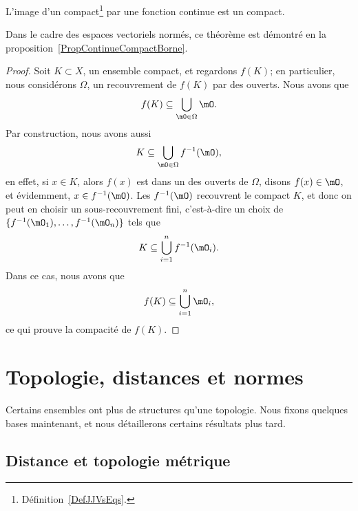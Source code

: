 \begin{theorem}     \label{ThoImCompCotComp}
L'image d'un compact\footnote{Définition~\ref{DefJJVsEqs}.} par une fonction continue est un compact.
\end{theorem}
Dans le cadre des espaces vectoriels normés, ce théorème est démontré en la proposition~\ref{PropContinueCompactBorne}.

\begin{proof}
    Soit $K\subset X$, un ensemble compact, et regardons $f(K)$; en particulier, nous considérons $\Omega$, un recouvrement de $f(K)$ par des ouverts. Nous avons que
    \begin{equation}
        f(K)\subseteq\bigcup_{\mO\in\Omega}\mO.
    \end{equation}
    Par construction, nous avons aussi
    \begin{equation}
        K\subseteq\bigcup_{\mO\in\Omega}f^{-1}(\mO),
    \end{equation}
    en effet, si $x\in K$, alors $f(x)$ est dans un des ouverts de $\Omega$, disons $f(x)\in \mO$, et évidemment, $x\in f^{-1}(\mO)$.  Les $f^{-1}(\mO)$ recouvrent le compact $K$, et donc on peut en choisir un sous-recouvrement fini, c'est-à-dire un choix de $\{ f^{-1}(\mO_1),\ldots,f^{-1}(\mO_n) \}$ tels que
    \begin{equation}
        K\subseteq \bigcup_{i=1}^nf^{-1}(\mO_i).
    \end{equation}
    Dans ce cas, nous avons que
    \begin{equation}
        f(K)\subseteq\bigcup_{i=1}^n\mO_i,
    \end{equation}
    ce qui prouve la compacité de $f(K)$.
\end{proof}

\section{Topologie, distances et normes}
Certains ensembles ont plus de structures qu'une topologie. Nous fixons quelques bases maintenant, et nous détaillerons certains résultats plus tard.

\subsection{Distance et topologie métrique}

